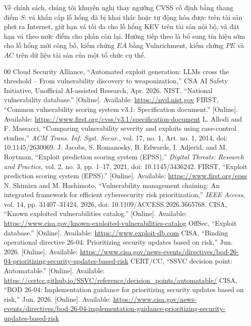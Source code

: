 \documentclass[conference]{IEEEtran}
\begin{document}
Về chính sách, chúng tôi khuyến nghị thay ngưỡng CVSS cố định bằng thang điểm $S$: vá khẩn cấp lỗ hổng đã bị khai thác
hoặc tự động hóa được trên tài sản phơi ra Internet, giữ hạn vá tối đa cho lỗ hổng KEV trên tài sản nội bộ, và đặt
hạn vá theo mức điểm cho phần còn lại. Hướng tiếp theo là bổ sung tín hiệu sớm cho lỗ hổng mới công bố, kiểm chứng
$\mathit{EA}$ bằng Vulnrichment, kiểm chứng $\mathit{PE}$ và $AC$ trên dữ liệu tài sản của một tổ chức cụ thể.

\begin{thebibliography}{00}
 Cloud Security Alliance, ``Automated exploit generation: LLMs cross the
threshold -- From vulnerability discovery to weaponization,'' CSA AI Safety Initiative,
Unofficial AI-assisted Research, Apr. 2026.
 NIST, ``National vulnerability database.'' [Online]. Available:
\url{https://nvd.nist.gov}
 FIRST, ``Common vulnerability scoring system v3.1: Specification document.''
[Online]. Available: \url{https://www.first.org/cvss/v3.1/specification-document}
 L. Allodi and F. Massacci, ``Comparing vulnerability severity and exploits
using case-control studies,'' \emph{ACM Trans. Inf. Syst. Secur.}, vol. 17, no. 1, Art. no. 1,
2014, doi: 10.1145/2630069.
 J. Jacobs, S. Romanosky, B. Edwards, I. Adjerid, and M. Roytman, ``Exploit prediction scoring system (EPSS),'' \emph{Digital Threats: Research and Practice}, vol. 2, no. 3, pp. 1--17, 2021, doi: 10.1145/3436242.
 FIRST, ``Exploit prediction scoring system (EPSS).'' [Online]. Available:
\url{https://www.first.org/epss}
 N. Shimizu and M. Hashimoto, ``Vulnerability management chaining: An
integrated framework for efficient cybersecurity risk prioritization,'' \emph{IEEE Access},
vol. 14, pp. 31407--31424, 2026, doi: 10.1109/ACCESS.2026.3665768.
 CISA, ``Known exploited vulnerabilities catalog.'' [Online]. Available:
\url{https://www.cisa.gov/known-exploited-vulnerabilities-catalog}
 OffSec, ``Exploit database.'' [Online]. Available:
\url{https://www.exploit-db.com}
 CISA, ``Binding operational directive 26-04: Prioritizing security updates based on risk,'' Jun. 2026. [Online]. Available: \url{https://www.cisa.gov/news-events/directives/bod-26-04-prioritizing-security-updates-based-risk}
 CERT/CC, ``SSVC decision point: Automatable.'' [Online]. Available: \url{https://certcc.github.io/SSVC/reference/decision_points/automatable/}
 CISA, ``BOD 26-04: Implementation guidance for prioritizing security updates based on risk,'' Jun. 2026. [Online]. Available: \url{https://www.cisa.gov/news-events/directives/bod-26-04-implementation-guidance-prioritizing-security-updates-based-risk}

\end{thebibliography}
\end{document}
